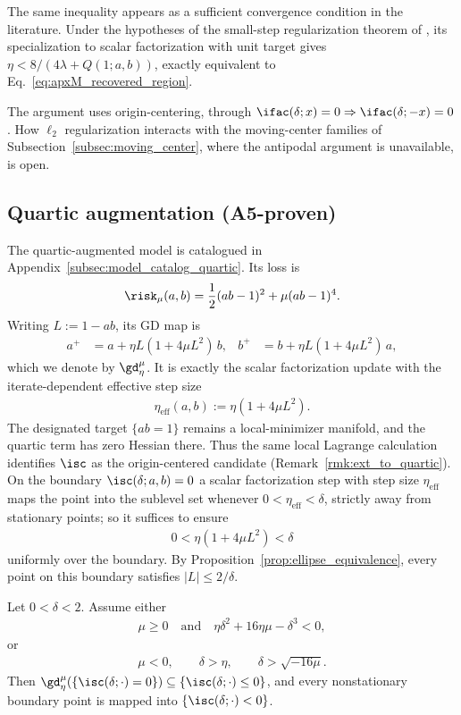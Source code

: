 \documentclass{article}
\begin{document}
The same inequality appears as a sufficient convergence condition in the
literature. Under the hypotheses of the small-step regularization theorem of
\citet{liang2025gradient}, its specialization to scalar factorization with unit
target gives $\eta<8/(4\lambda+Q(1;a,b))$, exactly equivalent to
Eq.~\eqref{eq:apxM_recovered_region}.

The argument uses origin-centering, through $\ifac(\delta;x)=0\Rightarrow
\ifac(\delta;-x)=0$. How $\ell_2$ regularization interacts with the
moving-center families of
Subsection~\ref{subsec:moving_center}, where the antipodal argument is
unavailable, is open.

\subsection{Quartic augmentation (A5-proven)}
\label{subsec:quartic_perturbation_boundary_inward}
The quartic-augmented model is catalogued in
Appendix~\ref{subsec:model_catalog_quartic}. Its loss is
\begin{align}
\risk_\mu(a,b)
=
\frac{1}{2}(ab-1)^2+\mu(ab-1)^4 .
\end{align}
Writing $L:=1-ab$, its GD map is
\begin{align}
    a^+&=a+\eta L(1+4\mu L^2)\,b,
    &
    b^+&=b+\eta L(1+4\mu L^2)\,a,
    \label{eq:apxM_gd_quartic}
\end{align}
which we denote by $\gd_\eta^\mu$. It is exactly the scalar factorization
update with the iterate-dependent effective step size
\begin{align}
\eta_{\mathrm{eff}}(a,b)
:=
\eta(1+4\mu L^2).
\end{align}
The designated target $\{ab=1\}$ remains a local-minimizer manifold, and the
quartic term has zero Hessian there. Thus the same local Lagrange calculation
identifies $\isc$ as the origin-centered candidate
(Remark~\ref{rmk:ext_to_quartic}). On the boundary
$\isc(\delta;a,b)=0$ a scalar factorization step with step size
$\eta_{\mathrm{eff}}$ maps the point into the sublevel set whenever
$0<\eta_{\mathrm{eff}}<\delta$, strictly away from stationary points; so it
suffices to ensure
\begin{align}
0<\eta(1+4\mu L^2)<\delta
\label{eq:quartic_effective_stepsize_condition}
\end{align}
uniformly over the boundary. By Proposition~\ref{prop:ellipse_equivalence},
every point on this boundary satisfies $|L|\le 2/\delta$.

\begin{proposition}
\label{prop:quartic_boundary_inward_sufficient}
Let $0<\delta<2$. Assume either
\begin{align}
\mu\ge 0
\quad\text{and}\quad
\eta\delta^2+16\eta\mu-\delta^3<0,
\label{eq:quartic_positive_mu_condition}
\end{align}
or
\begin{align}
\mu<0,
\qquad
\delta>\eta,
\qquad
\delta>\sqrt{-16\mu}.
\label{eq:quartic_negative_mu_condition}
\end{align}
Then
$\gd_\eta^\mu(\{\isc(\delta;\cdot)=0\})
\subseteq\{\isc(\delta;\cdot)\le0\}$, and every nonstationary boundary point
is mapped into $\{\isc(\delta;\cdot)<0\}$.
\end{proposition}
\end{document}

